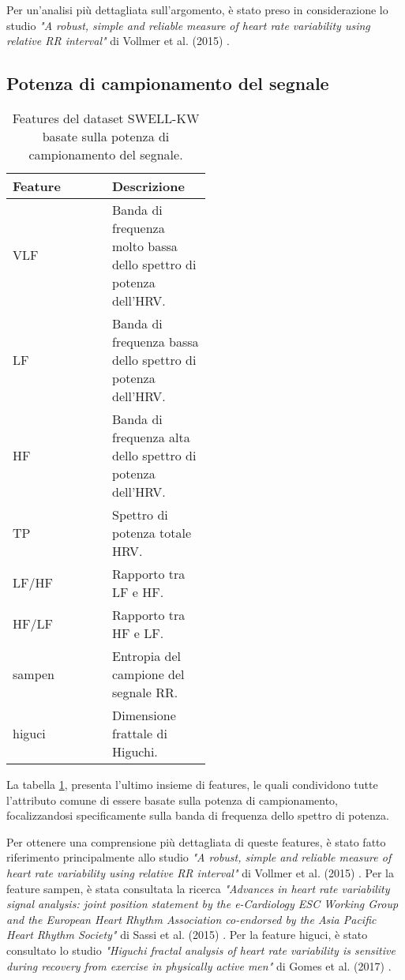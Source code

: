 \bigskip

Per un'analisi più dettagliata sull'argomento, è stato preso in considerazione lo studio \textit{"A robust, simple and reliable measure of heart rate variability using relative RR interval"} di Vollmer et al. (2015) \cite{vollmer2015robust}.

\subsection{Potenza di campionamento del segnale}

\begin{table}[t]
    \centering
    \begin{tabular}{|lp{0.5\linewidth}|}
        \hline
        \textbf{Feature}
        & \textbf{Descrizione} \\
        \hline
        VLF
        & Banda di frequenza molto bassa dello spettro di potenza dell'HRV. \\
        LF
        & Banda di frequenza bassa dello spettro di potenza dell'HRV. \\
        HF
        & Banda di frequenza alta dello spettro di potenza dell'HRV. \\
        TP
        & Spettro di potenza totale HRV. \\
        LF/HF
        & Rapporto tra LF e HF. \\
        HF/LF
        & Rapporto tra HF e LF. \\
        sampen
        & Entropia del campione del segnale RR. \\
        higuci
        & Dimensione frattale di Higuchi. \\
        \hline
    \end{tabular}
    \caption{Features del dataset SWELL-KW basate sulla potenza di campionamento del segnale.}
    \label{tab:2-5}
\end{table}

La tabella \ref{tab:2-5}, presenta l'ultimo insieme di features, le quali condividono tutte l'attributo comune di essere basate sulla potenza di campionamento, focalizzandosi specificamente sulla banda di frequenza dello spettro di potenza.

\bigskip

Per ottenere una comprensione più dettagliata di queste features, è stato fatto riferimento principalmente allo studio \textit{"A robust, simple and reliable measure of heart rate variability using relative RR interval"} di Vollmer et al. (2015) \cite{vollmer2015robust}. Per la feature sampen, è stata consultata la ricerca \textit{"Advances in heart rate variability signal analysis: joint position statement by the e-Cardiology ESC Working Group and the European Heart Rhythm Association co-endorsed by the Asia Pacific Heart Rhythm Society"} di Sassi et al. (2015) \cite{sassi2015advances}. Per la feature higuci, è stato consultato lo studio \textit{"Higuchi fractal analysis of heart rate variability is sensitive during recovery from exercise in physically active men"} di Gomes et al. (2017) \cite{gomes2017higuchi}.

